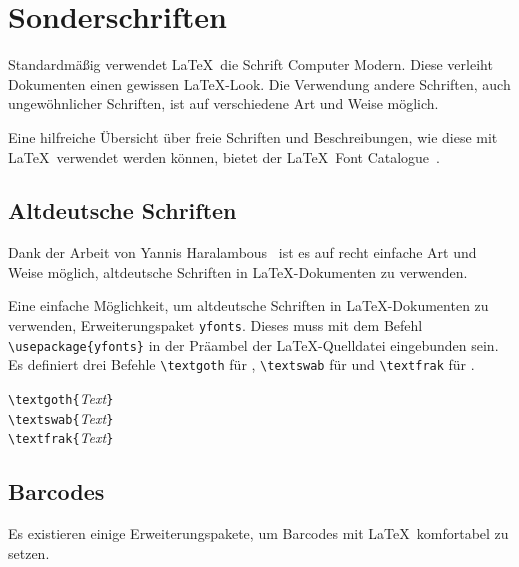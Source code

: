 \documentclass[a4paper,10pt,twoside]{scrbook}
\begin{document}
{\chapter{Sonderschriften}

Standardmäßig verwendet \LaTeX\ die Schrift Computer Modern. Diese verleiht 
Dokumenten einen gewissen \glqq\LaTeX-Look\grqq. 
Die Verwendung andere Schriften, auch ungewöhnlicher Schriften, ist auf verschiedene
Art und Weise möglich.

Eine hilfreiche Übersicht über freie Schriften und Beschreibungen, wie diese mit \LaTeX\ verwendet
werden können, bietet der \LaTeX\ Font Catalogue~\cite{LaTeXFontCatalogue}.



\section{Altdeutsche Schriften}

Dank der Arbeit von Yannis Haralambous~\cite{TypesettingOldGermanFonts_Dokumentation} ist es auf recht einfache Art und Weise möglich, altdeutsche Schriften in \LaTeX-Dokumenten zu verwenden.

Eine einfache Möglichkeit, um altdeutsche Schriften in \LaTeX-Dokumenten zu verwenden,
Erweiterungspaket \verb!yfonts!. Dieses muss mit dem Befehl \verb!\usepackage{yfonts}! in der Präambel der \LaTeX-Quelldatei
eingebunden sein. Es definiert drei Befehle 
\verb!\textgoth! 
für , 
\verb!\textswab! 
für 
und \verb!\textfrak! 
für .

\begin{boxedminipage}{\textwidth}
\texttt{\textbackslash textgoth\{}\textsl{Text}\texttt{\}} \\
\texttt{\textbackslash textswab\{}\textsl{Text}\texttt{\}} \\
\texttt{\textbackslash textfrak\{}\textsl{Text}\texttt{\}}
\end{boxedminipage}

\section{Barcodes}

Es existieren einige Erweiterungspakete, um Barcodes mit \LaTeX\ komfortabel zu setzen.

}
\end{document}
